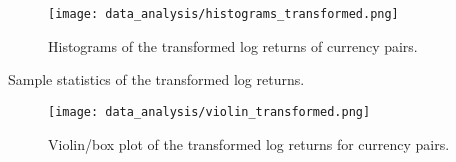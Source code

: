 \begin{figure}[!htb]
    \begin{center}
        \texttt{[image: data\_analysis/histograms\_transformed.png]}
    \end{center}
    \caption{Histograms of the transformed log returns of currency pairs.}
    \label{fig:histograms_transformed}
\end{figure}

\begin{table}[!htb]
    \centering
    \begin{adjustbox}{max width=\textwidth}
        
    \end{adjustbox}
    \caption{Sample statistics of the transformed log returns.}
    \label{tbl:data_log_returns_transformed_stats}
\end{table}

\begin{figure}[!htb]
    \begin{center}
        \texttt{[image: data\_analysis/violin\_transformed.png]}
    \end{center}
    \caption{Violin/box plot of the transformed log returns for currency pairs.}
    \label{fig:violin_transformed}
\end{figure}






